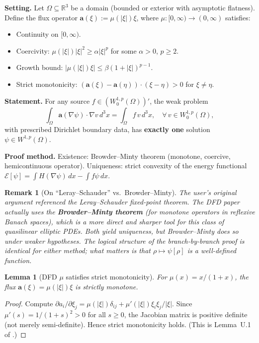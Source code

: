 \documentclass[aps,prd,twocolumn,superscriptaddress,nofootinbib]{revtex4-2}
\newtheorem{lemma}[theorem]{Lemma}
\newtheorem*{remark}{Remark}
\newcommand{\mufunction}{\mu}
\begin{document}
\begin{tcolorbox}[colback=blue!5!white, colframe=blue!60!black,
title=Theorem U.4 (Static Uniqueness)]
\textbf{Setting.} Let $\Omega \subseteq \mathbb{R}^3$ be a domain
(bounded or exterior with asymptotic flatness). Define the flux operator
$\mathbf{a}(\xi) := \mufunction(|\xi|)\xi$, where
$\mufunction: [0,\infty) \to (0,\infty)$ satisfies:
\begin{itemize}
\item[\textbf{(A1)}] Continuity on $[0,\infty)$.
\item[\textbf{(A2)}] Coercivity: $\mufunction(|\xi|)|\xi|^2 \geq \alpha|\xi|^p$
for some $\alpha > 0$, $p \geq 2$.
\item[\textbf{(A3)}] Growth bound: $|\mufunction(|\xi|)\xi| \leq \beta(1+|\xi|)^{p-1}$.
\item[\textbf{(A4)}] Strict monotonicity:
$(\mathbf{a}(\xi) - \mathbf{a}(\eta))\cdot(\xi - \eta) > 0$ for $\xi \neq \eta$.
\end{itemize}

\textbf{Statement.} For any source $f \in (W_0^{1,p}(\Omega))'$, the weak
problem
\begin{equation}
\int_\Omega \mathbf{a}(\nabla\psi)\cdot\nabla v\,d^3x =
\int_\Omega f\,v\,d^3x, \quad \forall\,v \in W_0^{1,p}(\Omega),
\end{equation}
with prescribed Dirichlet boundary data, has \textbf{exactly one} solution
$\psi \in W^{1,p}(\Omega)$.

\textbf{Proof method.} Existence: Browder--Minty theorem (monotone, coercive,
hemicontinuous operator). Uniqueness: strict convexity of the energy functional
$\mathcal{E}[\psi] = \int H(\nabla\psi)\,dx - \int f\psi\,dx$.
\end{tcolorbox}

\begin{remark}[On ``Leray--Schauder'' vs.\ Browder--Minty]
The user's original argument referenced the Leray--Schauder fixed-point
theorem. The DFD paper actually uses the \textbf{Browder--Minty theorem}
(for monotone operators in reflexive Banach spaces), which is a more direct
and sharper tool for this class of quasilinear elliptic PDEs. Both yield
uniqueness, but Browder--Minty does so under weaker hypotheses. The logical
structure of the branch-by-branch proof is identical for either method;
what matters is that $\rho \mapsto \psi[\rho]$ is a well-defined function.
\end{remark}

\begin{lemma}[DFD $\mufunction$ satisfies strict monotonicity]\label{lem:strict-mono}
For $\mufunction(x) = x/(1+x)$, the flux $\mathbf{a}(\xi) = \mufunction(|\xi|)\xi$
is strictly monotone.
\end{lemma}
\begin{proof}
Compute $\partial a_i / \partial \xi_j = \mufunction(|\xi|)\delta_{ij} +
\mufunction'(|\xi|)\xi_i\xi_j/|\xi|$. Since $\mufunction'(s) = 1/(1+s)^2 > 0$
for all $s \geq 0$, the Jacobian matrix is positive definite (not merely
semi-definite). Hence strict monotonicity holds. (This is Lemma~U.1 of
\cite{DFDUnified}.)
\end{proof}
\end{document}
